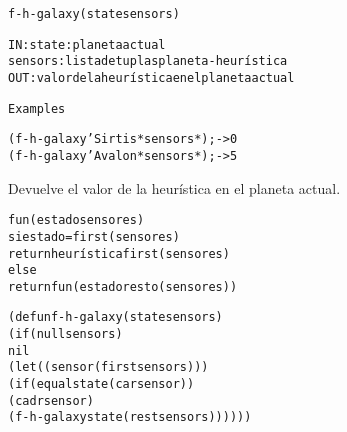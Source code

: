 \begin{aibox}{\function}
\begin{alltt}
f-h-galaxy (state sensors)


IN:     state: planeta actual
        sensors: lista de tuplas planeta-heurística
OUT: valor de la heurística en el planeta actual

\end{alltt}
\end{aibox}

\begin{aibox}{\examples}
\begin{alltt}
Examples

(f-h-galaxy 'Sirtis *sensors*) ;-> 0
(f-h-galaxy 'Avalon *sensors*) ;-> 5


\end{alltt}
\end{aibox}

\begin{aibox}{\comments}
Devuelve el valor de la heurística en el planeta actual.


\end{aibox}

\begin{aibox}{\pseudocode}
\begin{alltt}
fun ( estado sensores)
 si estado= first(sensores)
     return heurística first(sensores)
 else 
     return fun(estado resto(sensores))

\end{alltt}
\end{aibox}

\begin{aibox}{\code}
\begin{alltt}
(defun f-h-galaxy (state sensors)
  (if (null sensors)
      nil
      (let ((sensor (first sensors)))
        (if (equal state (car sensor))
            (cadr sensor)
            (f-h-galaxy state (rest sensors))))))




\end{alltt}
\end{aibox}
